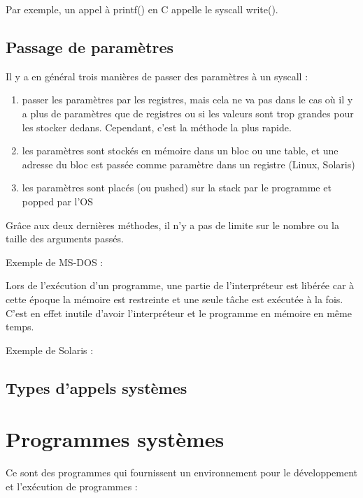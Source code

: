 Par exemple, un appel à printf() en C appelle le syscall write().


	\subsection{Passage de paramètres}
	
	Il y a en général trois manières de passer des paramètres à un syscall :
	
	\begin{enumerate}
		\item passer les paramètres par les registres, mais cela ne va pas dans le cas où il y a plus de paramètres que de registres ou si les valeurs sont trop grandes pour les stocker dedans. Cependant, c'est la méthode la plus rapide.
		\item les paramètres sont stockés en mémoire dans un bloc ou une table, et une adresse du bloc est passée comme paramètre dans un registre (Linux, Solaris)
		\item les paramètres sont placés (ou pushed) sur la stack par le programme et popped par l'OS
	\end{enumerate}
	
	Grâce aux deux dernières méthodes, il n'y a pas de limite sur le nombre ou la taille des arguments passés.
	
	Exemple de MS-DOS :
	
	
	Lors de l'exécution d'un programme, une partie de l'interpréteur est libérée car à cette époque la mémoire est restreinte et une seule tâche est exécutée à la fois. C'est en effet inutile d'avoir l'interpréteur et le programme en mémoire en même temps.
	
	Exemple de Solaris :
	
	
	\subsection{Types d'appels systèmes}
	
	
\section{Programmes systèmes}

Ce sont des programmes qui fournissent un environnement pour le développement et l'exécution de programmes : 

